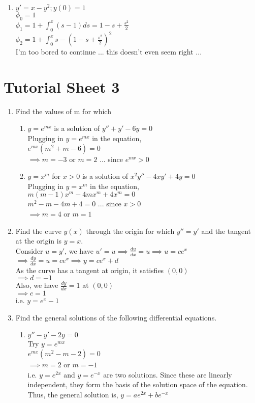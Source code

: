 \documentclass[a4paper]{article}
\begin{document}
\begin{enumerate}
{\begin{enumerate}
\item $y'=x-y^2; y(0)=1$ \\
$\phi_0=1$\\
$\phi_1=1+\int_0^x (s-1)ds = 1 - s + \frac{s^2}{2}$ \\
$\phi_2=1+\int_0^x s - (1 - s + \frac{s^2}{2})^2$\\
I'm too bored to continue ... this doesn't even seem right ...

\end{enumerate}
}
\end{enumerate}
\section{Tutorial Sheet 3}

\begin{enumerate}
	\item Find the values of m for which
	\begin{enumerate}
		\item $y=e^{mx}$ is a solution of $y''+y'-6y=0$
			\\Plugging in $y=e^{mx}$ in the equation,
			\\$e^{mx}(m^2+m-6)=0$
			\\$\implies m=-3$ or $m=2$ \hfill ... since $e^{mx}>0$
		\item $y=x^m$ for $x>0$ is a solution of $x^2y''-4xy'+4y=0$
			\\Plugging in $y=x^m$ in the equation,
			\\$m(m-1)x^m-4mx^m+4x^m=0$
			\\$m^2-m-4m+4=0$ \hfill ... since $x>0$
			\\$\implies m=4$ or $m=1$
	\end{enumerate}
	
	\item Find the curve $y(x)$ through the origin for which $y''=y'$ and the tangent at the origin is $y=x$.
	\\Consider $u=y'$, we have $u'=u \implies \frac{du}{dx}=u \implies u=ce^x$
	\\$\implies \frac{dy}{dx}=u=ce^x \implies y=ce^x + d$
	\\As the curve has a tangent at origin, it satisfies $(0,0)$
	\\$\implies d=-1$
	\\Also, we have $\frac{dy}{dx}=1$ at $(0,0)$
	\\$\implies c=1$
	\\i.e. $y=e^x-1$
	
	\item Find the general solutions of the following differential equations.
	\begin{enumerate}
		\item $y''-y'-2y=0$
			\\Try $y=e^{mx}$
			\\$e^{mx}(m^2-m-2)=0$
			\\$\implies m=2$ or $m=-1$
			\\i.e. $y=e^{2x}$ and $y=e^{-x}$ are two solutions. Since these are linearly independent, they form the basis of the solution space of the equation. Thus, the general solution is,
			$y=ae^{2x}+be^{-x}$
		

\end{enumerate}
\end{enumerate}
\end{document}
